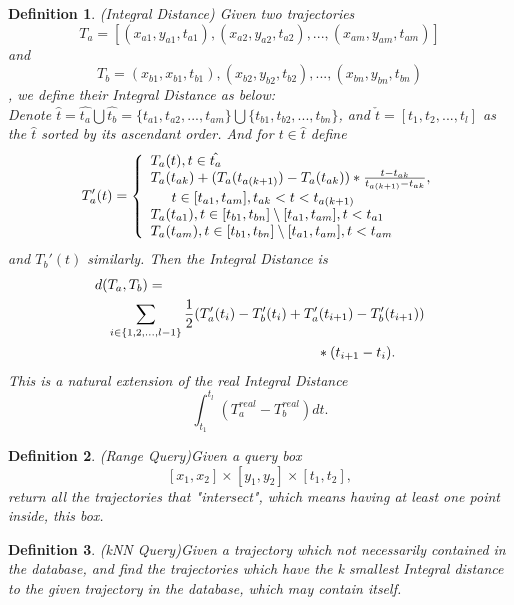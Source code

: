 \documentclass[sigplan]{acmart}
\newtheorem{myDef}{Definition}
\begin{document}
\begin{myDef}
  (Integral Distance) Given two trajectories $$T_a=[(x_{a1},y_{a1},t_{a1}), (x_{a2},y_{a2},t_{a2}), ..., (x_{am},y_{am},t_{am})]$$ and $$T_b=(x_{b1},x_{b1},t_{b1}), (x_{b2}, y_{b2}, t_{b2}), ..., (x_{bn}, y_{bn}, t_{bn})$$, we define their Integral Distance as below:\\
  Denote $\hat{t}=\hat{t_a}\bigcup\hat{t_b}=\{t_{a1}, t_{a2}, ..., t_{am}\}\bigcup \{t_{b1}, t_{b2}, ..., t_{bn}\}$, and $\check{t}=[t_1, t_2, ..., t_l]$ as the $\hat{t}$ sorted by its ascendant order. And for $t \in \hat{t}$ define
  $$T_a'(t)=\left\{
             \begin{array}{lr}
             T_a(t), t \in \hat{t_a} \\
             T_a(t_{ak})+ (T_a(t_{a(k+1)})-T_a(t_{ak}))* \frac{t-t_{ak}}{t_{a(k+1)}-t_{ak}}, \\
             \indent  t \in [t_{a1}, t_{am}], t_{ak}<t<t_{a(k+1)} \\
             T_a(t_{a1}), t \in [t_{b1},t_{bn}] \setminus [t_{a1},t_{am}], t< t_{a1} \\
             T_a(t_{am}), t \in [t_{b1},t_{bn}] \setminus [t_{a1},t_{am}], t< t_{am}
             \end{array}
    \right.$$
  and $T_b'(t)$ similarly. Then the Integral Distance is
  $$
  \begin{aligned}
  d(&T_a,T_b)=\\
  &\sum_{i \in \{1, 2, ..., l-1\}} \frac{1}{2} (T_a'(t_i)-T_b'(t_i)+T_a'(t_{i+1})-T_b'(t_{i+1}))\\
  &\indent\indent\indent\indent\indent\indent\indent\indent\indent\indent*(t_{i+1}-t_i).
  \end{aligned}
  $$
  This is a natural extension of the real Integral Distance
  $$\int_{t_1}^{t_l}(T_{a}^{real}-T_{b}^{real})dt.$$
\end{myDef}
\begin{myDef}
  (Range Query)Given a query box $$[x_1,x_2] \times [y_1,y_2] \times [t_1,t_2],$$return all the trajectories that "intersect", which means having at least one point inside, this box.
\end{myDef}
\begin{myDef}
  (kNN Query)Given a trajectory which not necessarily contained in the database, and find the trajectories which have the k smallest Integral distance to the given trajectory in the database, which may contain itself.
\end{myDef}
\end{document}
